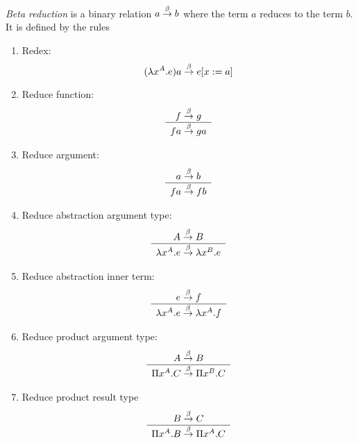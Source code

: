 \begin{definition}
    \emph{Beta reduction}
    is a binary relation $a \stackrel{\beta}{\to} b$ where the term $a$
    reduces to the term $b$. It is defined by the rules
    \begin{enumerate}
        \item Redex:
            $$
                (\lambda x^A. e) a \stackrel{\beta}{\to} e[x:=a]
            $$

        \item Reduce function:
            $$
                \begin{array}{c} 
                    f \stackrel{\beta}{\to} g
                 \\ \hline 
                    f a \stackrel{\beta}{\to} g a
                \end{array}
            $$

        \item Reduce argument:
            $$
                \begin{array}{c} 
                    a \stackrel{\beta}{\to} b
                 \\ \hline 
                    f a \stackrel{\beta}{\to} f b
                \end{array}
            $$

        \item Reduce abstraction argument type:
            $$
                \begin{array}{c} 
                    A \stackrel{\beta}{\to} B
                 \\ \hline 
                    \lambda x^A. e \stackrel{\beta}{\to} \lambda x^B . e
                \end{array}
            $$

        \item Reduce abstraction inner term:
            $$
                \begin{array}{c} 
                    e \stackrel{\beta}{\to} f
                 \\ \hline 
                    \lambda x^A. e \stackrel{\beta}{\to} \lambda x^A. f
                \end{array}
            $$

        \item Reduce product argument type:
            $$
                \begin{array}{c} 
                    A \stackrel{\beta}{\to} B
                 \\ \hline 
                    \Pi x^A. C \stackrel{\beta}{\to} \Pi x^B . C
                \end{array}
            $$

        \item Reduce product result type
            $$
                \begin{array}{c} 
                    B \stackrel{\beta}{\to} C
                 \\ \hline 
                    \Pi x^A. B \stackrel{\beta}{\to} \Pi x^A. C
                \end{array}
            $$
    \end{enumerate}
\end{definition}

